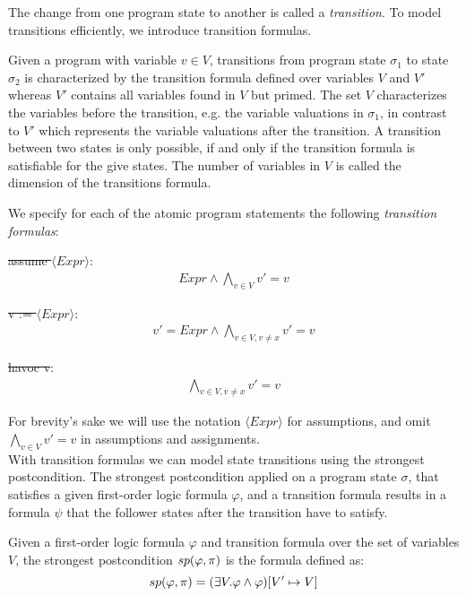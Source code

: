 The change from one program state to another is called a \textsl{transition}. To model transitions efficiently, we introduce transition formulas.
\begin{mydef}
		Given a program \prg with variable $v \in V$, transitions from program state $\sigma_1$ to state $\sigma_2$ is characterized by the transition formula defined over variables $V$ and $V'$ whereas $V'$ contains all variables found in $V$ but primed. The set $V$ characterizes the variables before the transition, e.g. the variable valuations in $\sigma_1$, in contrast to $V'$ which represents the variable valuations after the transition. A transition between two states is only possible, if and only if the transition formula is satisfiable for the give states. The number of variables in $V$ is called the dimension of the transitions formula.
\end{mydef}
 We specify for each of the atomic program statements the following \textsl{transition formulas}: 
 \begin{center}
	\st{assume $\langle Expr \rangle$}:
	\begin{align*}
		Expr \land \bigwedge\limits_{v \in V} v' = v
	\end{align*}
	\vspace*{0.5cm}

	\st{v := $\langle Expr \rangle$}:
	\begin{align*}
		v' = Expr \land \bigwedge\limits_{v \in V, v \not= x} v' = v 
	\end{align*}
	\vspace*{0.5cm}
	
	\st{havoc v}: 
	\begin{align*}
			\bigwedge\limits_{v \in V, v \not= x} v' = v 
	\end{align*}
 \end{center}
For brevity's sake we will use the notation \st{$\langle Expr \rangle$} for assumptions, and omit $\bigwedge\limits_{v \in V} v' = v$ in assumptions and assignments. \\
With transition formulas we can model state transitions using the strongest postcondition. The strongest postcondition applied on a program state $\sigma$, that satisfies a given first-order logic formula $\varphi$, and a transition formula \trf results in a formula $\psi$ that the follower states after the transition have to satisfy.
\begin{mydef}
	Given a first-order logic formula $\varphi$ and transition formula \trf over the set of variables $V$, the strongest postcondition $	sp(\varphi, \pi)$ is the formula defined as:
	\begin{equation*}
		sp(\varphi, \pi) = (\exists V. \varphi \land \varphi)[V' \mapsto V]
	\end{equation*}
\end{mydef}
